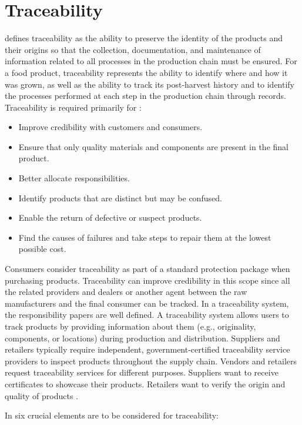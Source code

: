 \section{Traceability}\label{sec:traceability}

 defines traceability as the ability to preserve the identity of the products and their origins so that the collection, documentation, and maintenance of information related to all processes in the production chain must be ensured. For a food product, traceability represents the ability to identify where and how it was grown, as well as the ability to track its post-harvest history and to identify the processes performed at each step in the production chain through records. Traceability is required primarily for \cite{horiuchirastreabilidade}:
\begin{itemize}
\item Improve credibility with customers and consumers.
\item Ensure that only quality materials and components are present in the final product.
\item Better allocate responsibilities.
\item Identify products that are distinct but may be confused.
\item Enable the return of defective or suspect products.
\item Find the causes of failures and take steps to repair them at the lowest possible cost.
\end{itemize}

Consumers consider traceability as part of a standard protection package when purchasing products. Traceability can improve credibility in this scope since all the related providers and dealers or another agent between the raw manufacturers and the final consumer can be tracked. In a traceability system, the responsibility papers are well defined. A traceability system allows users to track products by providing information about them (e.g., originality, components, or locations) during production and distribution. Suppliers and retailers typically require independent, government-certified traceability service providers to inspect products throughout the supply chain. Vendors and retailers request traceability services for different purposes. Suppliers want to receive certificates to showcase their products. Retailers want to verify the origin and quality of products \cite{lu2017adaptable}.


In \cite{opara2003traceability} six crucial elements are to be considered for traceability:

